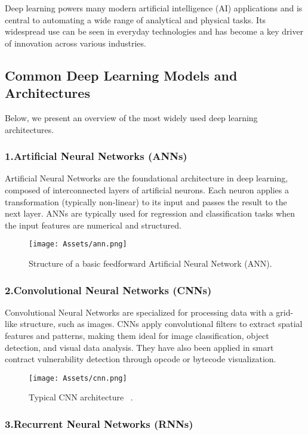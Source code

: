 Deep learning powers many modern artificial intelligence (AI) applications and is central to automating a wide range of analytical and physical tasks. Its widespread use can be seen in everyday technologies and has become a key driver of innovation across various industries.
\subsection{Common Deep Learning Models and Architectures}
Below, we present an overview of the most widely used deep learning architectures.
\subsubsection*{1.Artificial Neural Networks (ANNs)}

Artificial Neural Networks are the foundational architecture in deep learning, composed of interconnected layers of artificial neurons. Each neuron applies a transformation (typically non-linear) to its input and passes the result to the next layer. ANNs are typically used for regression and classification tasks when the input features are numerical and structured.

\begin{figure}[H]
    \centering
    \texttt{[image: Assets/ann.png]}
    \caption{Structure of a basic feedforward Artificial Neural Network (ANN).}
    \label{fig:ann}
\end{figure}

\subsubsection*{2.Convolutional Neural Networks (CNNs)}
Convolutional Neural Networks are specialized for processing data with a grid-like structure, such as images. CNNs apply convolutional filters to extract spatial features and patterns, making them ideal for image classification, object detection, and visual data analysis. They have also been applied in smart contract vulnerability detection through opcode or bytecode visualization.
\begin{figure}[H]
    \centering
    \texttt{[image: Assets/cnn.png]}
    \caption{Typical CNN architecture ~\cite{raj2019cnn}.}
    \label{fig:cnn}
\end{figure}

\subsubsection*{3.Recurrent Neural Networks (RNNs)}

